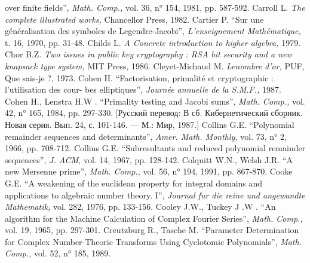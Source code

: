 \documentclass{../../template/mai_book}
\begin{document}
over finite fields”, {\itshape Math. Comp.,} vol. 36, n° 154, 1981, pp. 587-592. \newline
[44] Carroll L. {\itshape The complete illustrated works,} Chancellor Press, 1982. \newline
[45] Cartier P. “Sur une g\'{e}n\'{e}ralisation des symboles de Legendre-Jacobi”, {\itshape L’enseignement Math\'{e}matique,} t. 16, 1970, pp. 31-48. \newline
[46] Childs L. {\itshape A Concrete introduction to higher algebra,} 1979. \newline
[47] Chor B.Z. {\itshape Two issues in public key cryptography : RSA bit security and a new knapsack type system,} MIT Press, 1986. \newline
[48] Cleyet-Michaud M. {\itshape Lenombre d’or,} PUF, Que sais-je ?, 1973. \newline
[49] Cohen H. “Factorisation, primalit\'{e} et cryptographic : l’utilisation des cour- \newline bes elliptiques”, {\itshape Journ\'{e}e annuelle de la S.M.F.,} 1987. \newline
[50] Cohen H., Lenstra H.W . “Primality testing and Jacobi sums”, {\itshape Math. Comp.,} vol. 42, n° 165, 1984, pp. 297-330. [Русский перевод: В сб. Кибернетический сборник. Новая серия. Вып. 24, с. 101-146. — М.: Мир,
1987.] \newline
[51] Collins G.E. “Polynomial remainder sequences and determinants”,
{\itshape Amer. Math. Monthly,} vol. 73, n° 2, 1966, pp. 708-712. \newline
[52] Collins G.E. “Subresultants and reduced polynomial remainder sequences”, {\itshape J. ACM,} vol. 14, 1967, pp. 128-142. \newline
[53] Colquitt W.N., Welsh J.R. “A new Mersenne prime”, {\itshape Math. Comp.,} vol. 56, n° 194, 1991, pp. 867-870. \newline
[54] Cooke G.E. “A weakening of the euclidean property for integral domains and applications to algebraic number theory. I”, {\itshape Journal fur die reine und angewandte Mathematik,} vol. 282, 1976, pp. 133-156. \newline
[55] Cooley J.W., Tuckey J .W . “An algorithm for the Machine Calculation
of Complex Fourier Series”, {\itshape Math. Comp.,} vol. 19, 1965, pp. 297-301. \newline
\newpage
\noindent
[56] Creutzburg R., Tasche M. “Parameter Determination for Complex
Number-Theoric Transforms Using Cyclotomic Polynomials”, {\itshape Math. Comp.,} vol. 52, n° 185, 1989. \newline
\end{document}
